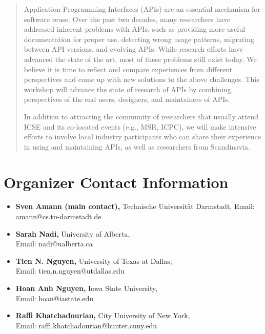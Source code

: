 \documentclass[sigconf]{acmart}
\begin{document}
\begin{abstract}
Application Programming Interfaces (APIs) are an essential mechanism for software reuse. Over the past two decades, many researchers have addressed inherent problems with APIs, such as providing more useful documentation for proper use, detecting wrong usage patterns, migrating between API versions, and evolving APIs. While research efforts have advanced the state of the art, most of these problems still exist today. We believe it is time to reflect and compare experiences from different perspectives and come up with new solutions to the above challenges. This workshop will advance the state of research of APIs by combining perspectives of the end users, designers, and maintainers of APIs.

In addition to attracting the community of researchers that usually attend ICSE and its co-located events (e.g., MSR, ICPC), we will make intensive efforts to involve local industry participants who can share their experience in using and maintaining APIs, as well as researchers from Scandinavia.
\end{abstract}

\maketitle


\section{Organizer Contact Information}
\begin{itemize}
\setlength\itemsep{5pt}
\item \textbf{Sven Amann (main contact),} Technische Universit\"{a}t Darmstadt, Email: amann@cs.tu-darmstadt.de
\item \textbf{Sarah Nadi,} University of Alberta,\\Email: nadi@ualberta.ca
\item \textbf{Tien N. Nguyen,} University of Texas at Dallas,\\Email: tien.n.nguyen@utdallas.edu
\item \textbf{Hoan Anh Nguyen,} Iowa State University,\\Email: hoan@iastate.edu
\item \textbf{Raffi Khatchadourian,} City University of New York,\\Email: raffi.khatchadourian@hunter.cuny.edu
\end{itemize}
\end{document}
